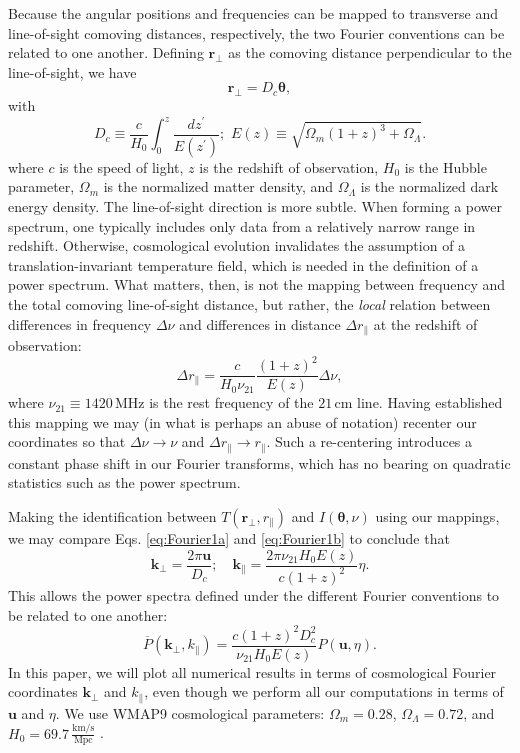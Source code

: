 \documentclass[twocolumn,aps,prd,nofootinbib,showpacs]{revtex4-1}
\begin{document}
Because the angular positions and frequencies can be mapped to transverse and line-of-sight comoving distances, respectively, the two Fourier conventions can be related to one another.  Defining $\mathbf{r}_\perp$ as the comoving distance perpendicular to the line-of-sight, we have
\begin{equation}
\mathbf{r}_\perp = D_c \boldsymbol \theta,
\end{equation}
with
\begin{equation}
D_c \equiv \frac{c}{H_0} \int_0^z \frac{dz^\prime}{E(z^\prime)}; \,\, E(z) \equiv \sqrt{\Omega_m (1+z)^3 + \Omega_\Lambda}.
\end{equation}
where $c$ is the speed of light, $z$ is the redshift of observation, $H_0$ is the Hubble parameter, $\Omega_m$ is the normalized matter density, and $\Omega_\Lambda$ is the normalized dark energy density.  The line-of-sight direction is more subtle.  When forming a power spectrum, one typically includes only data from a relatively narrow range in redshift.  Otherwise, cosmological evolution invalidates the assumption of a translation-invariant temperature field, which is needed in the definition of a power spectrum.  What matters, then, is not the mapping between frequency and the total comoving line-of-sight distance, but rather, the \emph{local} relation between differences in frequency $\Delta \nu$ and differences in distance $\Delta r_\parallel$ at the redshift of observation:
\begin{equation}
\Delta r_\parallel = \frac{c}{H_0 \nu_{21}} \frac{(1+z)^2}{E(z)} \Delta \nu,
\end{equation}
where $\nu_{21} \equiv 1420 \,\textrm{MHz}$ is the rest frequency of the $21\,\textrm{cm}$ line.  Having established this mapping we may (in what is perhaps an abuse of notation) recenter our coordinates so that $\Delta \nu \rightarrow \nu$ and $\Delta r_\parallel \rightarrow r_\parallel$.  Such a re-centering introduces a constant phase shift in our Fourier transforms, which has no bearing on quadratic statistics such as the power spectrum.

Making the identification between $T(\mathbf{r}_\perp, r_\parallel)$ and $I(\boldsymbol \theta, \nu)$ using our mappings, we may compare  Eqs. \eqref{eq:Fourier1a} and \eqref{eq:Fourier1b} to conclude that
\begin{equation}
\mathbf{k}_\perp = \frac{2\pi \mathbf{u}}{D_c}; \quad \mathbf{k}_\parallel =  \frac{2\pi \nu_{21} H_0 E(z)}{c(1+z)^2} \eta.
\end{equation}
This allows the power spectra defined under the different Fourier conventions to be related to one another:
\begin{equation}
\overline{P}(\mathbf{k}_\perp, k_\parallel) = \frac{c(1+z)^2 D_c^2}{\nu_{21} H_0E(z)} P(\mathbf{u},\eta).
\end{equation}
In this paper, we will plot all numerical results in terms of cosmological Fourier coordinates $\mathbf{k}_\perp$ and $k_\parallel$, even though we perform all our computations in terms of $\mathbf{u}$ and $\eta$.  We use WMAP9 cosmological parameters: $\Omega_m = 0.28$, $\Omega_\Lambda = 0.72$, and $H_0 = 69.7\,\frac{\textrm{km} /\textrm{s}}{\textrm{Mpc}}$ \cite{HinshawEtAl2013}.
\end{document}
